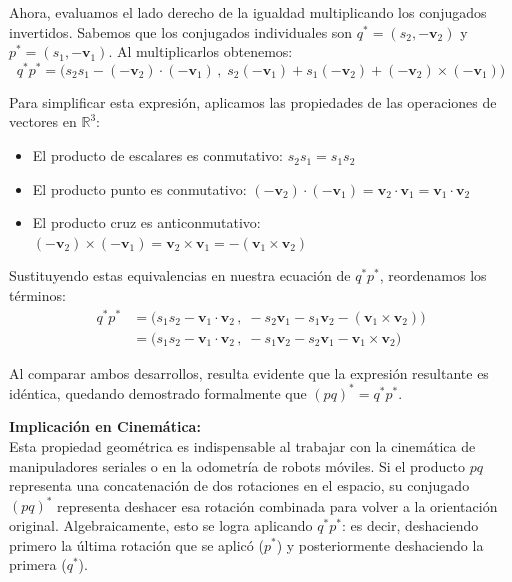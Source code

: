 Ahora, evaluamos el lado derecho de la igualdad multiplicando los conjugados invertidos. Sabemos que los conjugados individuales son $q^* = (s_2, -\mathbf{v}_2)$ y $p^* = (s_1, -\mathbf{v}_1)$. Al multiplicarlos obtenemos:
\begin{equation*}
    q^* p^* = \big( s_2 s_1 - (-\mathbf{v}_2) \cdot (-\mathbf{v}_1) \, , \; s_2(-\mathbf{v}_1) + s_1(-\mathbf{v}_2) + (-\mathbf{v}_2) \times (-\mathbf{v}_1) \big)
\end{equation*}

Para simplificar esta expresión, aplicamos las propiedades de las operaciones de vectores en $\mathbb{R}^3$:
\begin{itemize}
    \item El producto de escalares es conmutativo: $s_2 s_1 = s_1 s_2$
    \item El producto punto es conmutativo: $(-\mathbf{v}_2) \cdot (-\mathbf{v}_1) = \mathbf{v}_2 \cdot \mathbf{v}_1 = \mathbf{v}_1 \cdot \mathbf{v}_2$
    \item El producto cruz es anticonmutativo: $(-\mathbf{v}_2) \times (-\mathbf{v}_1) = \mathbf{v}_2 \times \mathbf{v}_1 = -(\mathbf{v}_1 \times \mathbf{v}_2)$
\end{itemize}

Sustituyendo estas equivalencias en nuestra ecuación de $q^* p^*$, reordenamos los términos:
\begin{align*}
    q^* p^* &= \big( s_1 s_2 - \mathbf{v}_1 \cdot \mathbf{v}_2 \, , \; -s_2 \mathbf{v}_1 - s_1 \mathbf{v}_2 - (\mathbf{v}_1 \times \mathbf{v}_2) \big) \\
    &= \big( s_1 s_2 - \mathbf{v}_1 \cdot \mathbf{v}_2 \, , \; -s_1 \mathbf{v}_2 - s_2 \mathbf{v}_1 - \mathbf{v}_1 \times \mathbf{v}_2 \big)
\end{align*}

Al comparar ambos desarrollos, resulta evidente que la expresión resultante es idéntica, quedando demostrado formalmente que $(pq)^* = q^* p^*$. 

\textbf{Implicación en Cinemática:} \\
Esta propiedad geométrica es indispensable al trabajar con la cinemática de manipuladores seriales o en la odometría de robots móviles. Si el producto $pq$ representa una concatenación de dos rotaciones en el espacio, su conjugado $(pq)^*$ representa deshacer esa rotación combinada para volver a la orientación original. Algebraicamente, esto se logra aplicando $q^* p^*$: es decir, deshaciendo primero la última rotación que se aplicó ($p^*$) y posteriormente deshaciendo la primera ($q^*$).


